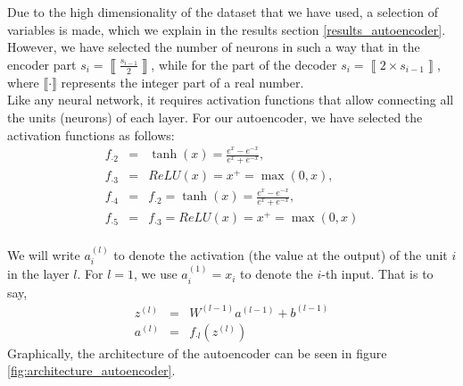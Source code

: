 \documentclass{iosart2c}
\begin{document}
Due to the high dimensionality of the dataset that we have used, a selection of variables is made, which we explain in the results section \ref{results_autoencoder}. However, we have selected the number of neurons in such a way that in the encoder part $s_i=\left\llbracket\frac{s_{i-1}}{2}\right\rrbracket$, while for the part of the decoder $s_i=\left\llbracket 2\times s_{i-1} \right\rrbracket$, where $\llbracket \cdot \rrbracket$ represents the integer part of a real number. \\

Like any neural network, it requires activation functions that allow connecting all the units (neurons) of each layer. For our autoencoder, we have selected the activation functions as follows:
\begin{eqnarray*}
f_{\cdot 2} &=& \tanh(x)=\frac{e^{x}-e^{-x}}{ e^{x}+e^{-x}},\\
f_{\cdot 3} &=& ReLU(x) = x^+ = \max(0, x),\\
f_{\cdot 4} &=& f_{\cdot 2} = \tanh(x)=\frac{e^{x}-e^{-x}}{ e^{x}+e^{-x}},\\
f_{\cdot 5} &=& f_{\cdot 3} = ReLU(x) = x^+ = \max(0, x)\\
\end{eqnarray*}

We will write $a_i^{(l)}$ to denote the activation (the value at the output) of the unit $i$ in the layer $l$. For $l=1$, we use $a_i^{(1)}=x_i$ to denote the $i$-th input. That is to say,
\begin{eqnarray*}
z^{(l)}&=&W^{(l-1)}a^{(l-1)}+b^{(l-1)}\\
a^{(l)}&=&f_{\cdot l}(z^{(l)})
\end{eqnarray*}
Graphically, the architecture of the autoencoder can be seen in figure \ref{fig:architecture_autoencoder}. \\
\end{document}
